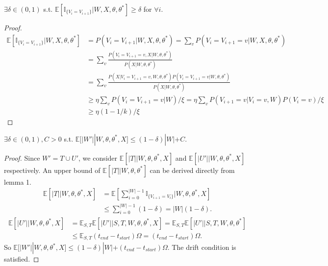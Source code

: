 \begin{lemma}
$\exists \delta \in (0, 1)$ s.t. $\mathbb{E}[\mathbb{I}_{\{V_i = V_{i + 1}\}} | W, X, \theta, \theta^*] \geq \delta$ for $\forall i$. 
\end{lemma}
\begin{proof}
\begin{align*}
\mathbb{E}[\mathbb{I}_{\{V_i = V_{i + 1}\}} | W, X, \theta, \theta^*] &= P(V_i = V_{i + 1} | W, X, \theta, \theta^*) = \sum_v P(V_i = V_{i + 1} = v | W, X, \theta, \theta^*)\\
& =\sum_v \frac{P(V_i = V_{i + 1} = v, X | W, \theta, \theta^*)}{P(X | W, \theta, \theta^*)} \\
&=\sum_v \frac{P(X | V_i = V_{i + 1} = v, W, \theta, \theta^*)P( V_i = V_{i + 1} = v|W, \theta, \theta^*)}{P(X | W, \theta, \theta^*)}\\
& \geq \eta\sum_v P(V_i = V_{i + 1} = v | W) /\xi =  \eta \sum_v P(V_{i + 1} = v | V_i = v, W)P(V_i = v) /\xi \\
& \geq \eta (1 - 1/k)/\xi 
\end{align*}
\end{proof}
\begin{theorem}
$\exists \delta \in (0, 1), C > 0$ s.t. $\mathbb{E}[|W'| | W, \theta, \theta^*, X] \leq (1 - \delta)|W| + C$.
\end{theorem}
\begin{proof}
Since $W' = T \cup U'$, we consider $\mathbb{E}[|T| | W, \theta, \theta^*, X]$ and $\mathbb{E}[|U'| | W, \theta, \theta^*, X]$ respectively.
An upper bound of $\mathbb{E}[|T| | W, \theta, \theta^*]$ can be derived directly from lemma 1.
\begin{align*}
\mathbb{E}[|T| | W, \theta, \theta^*, X] &= \mathbb{E}[\sum_{i = 0}^{|W| - 1} \mathbb{I}_{\{ V_{i + 1} = V_i \}}| W, \theta, \theta^*, X]\\
&\leq \sum_{i = 0}^{|W| - 1} (1 - \delta) = |W|(1 - \delta).
\end{align*}
\begin{align*}
\mathbb{E}[|U'| |W, \theta, \theta^*, X] &= \mathbb{E}_{S,T}\mathbb{E}[|U'| | S, T, W, \theta, \theta^*, X] = \mathbb{E}_{S,T}\mathbb{E}[|U'| | S, T, W, \theta, \theta^*] \\
& \leq \mathbb{E}_{S,T} (t_{end} - t_{start})\Omega = (t_{end} - t_{start})\Omega.
\end{align*}
So $\mathbb{E}[|W'| | W, \theta, \theta^*, X] \leq (1 - \delta)|W| + (t_{end} - t_{start})\Omega$. The drift condition is satisfied.
\end{proof}
